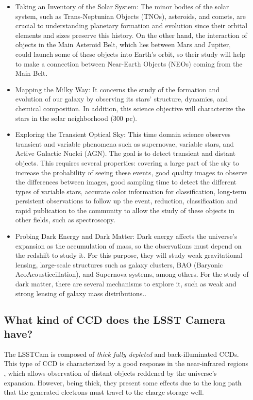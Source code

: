 \begin{itemize}
    \item Taking an Inventory of the Solar System: The minor bodies of the solar system, such as Trans-Neptunian Objects (TNOs), asteroids, and comets, are crucial to understanding planetary formation and evolution since their orbital elements and sizes preserve this history. On the other hand, the interaction of objects in the Main Asteroid Belt, which lies between Mars and Jupiter, could launch some of these objects into Earth's orbit, so their study will help to make a connection between Near-Earth Objects (NEOs) coming from the Main Belt. 
    
    \item Mapping the Milky Way: It concerns the study of the formation and evolution of our galaxy by observing its stars' structure, dynamics, and chemical composition. In addition, this science objective will characterize the stars in the solar neighborhood (300 pc).
    
    \item Exploring the Transient Optical Sky: This time domain science observes transient and variable phenomena such as supernovae, variable stars, and Active Galactic Nuclei (AGN). The goal is to detect transient and distant objects. This requires several properties: covering a large part of the sky to increase the probability of seeing these events, good quality images to observe the differences between images, good sampling time to detect the different types of variable stars, accurate color information for classification, long-term persistent observations to follow up the event, reduction, classification and rapid publication to the community to allow the study of these objects in other fields, such as spectroscopy. 
    
    \item Probing Dark Energy and Dark Matter: Dark energy affects the universe's expansion as the accumulation of mass, so the observations must depend on the redshift to study it. For this purpose, they will study weak gravitational lensing, large-scale structures such as galaxy clusters, BAO (Baryonic AcoAcousticcillation), and Supernova systems, among others. For the study of dark matter, there are several mechanisms to explore it, such as weak and strong lensing of galaxy mass distributions.. 
\end{itemize}

\subsection{What kind of CCD does the LSST Camera have?}
The LSSTCam is composed of \textit{thick fully depleted} and back-illuminated CCDs\citep{2009arXiv0912.0201L}. This type of CCD is characterized by a good response in the near-infrared regions \citep{lage2017measurements}, which allows observation of distant objects reddened by the universe's expansion. However, being thick, they present some effects due to the long path that the generated electrons must travel to the charge storage well. 

